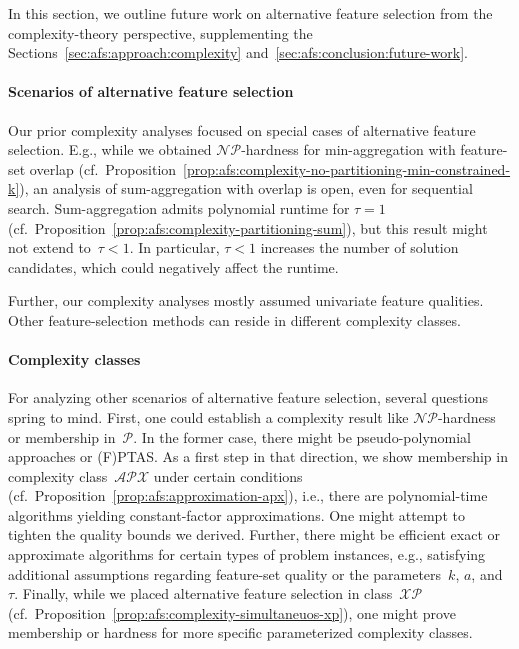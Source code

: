 \documentclass{article}
\theoremstyle{definition}
\begin{document}
In this section, we outline future work on alternative feature selection from the complexity-theory perspective, supplementing the Sections~\ref{sec:afs:approach:complexity} and~\ref{sec:afs:conclusion:future-work}.

\paragraph{Scenarios of alternative feature selection}

Our prior complexity analyses focused on special cases of alternative feature selection.
E.g., while we obtained $\mathcal{NP}$-hardness for min-aggregation with feature-set overlap (cf.~Proposition~\ref{prop:afs:complexity-no-partitioning-min-constrained-k}), an analysis of sum-aggregation with overlap is open, even for sequential search.
Sum-aggregation admits polynomial runtime for $\tau=1$ (cf.~Proposition~\ref{prop:afs:complexity-partitioning-sum}), but this result might not extend to~$\tau < 1$.
In particular, $\tau < 1$ increases the number of solution candidates, which could negatively affect the runtime.

Further, our complexity analyses mostly assumed univariate feature qualities.
Other feature-selection methods can reside in different complexity classes.

\paragraph{Complexity classes}

For analyzing other scenarios of alternative feature selection, several questions spring to mind.
First, one could establish a complexity result like $\mathcal{NP}$-hardness or membership in~$\mathcal{P}$.
In the former case, there might be pseudo-polynomial approaches or (F)PTAS.
As a first step in that direction, we show membership in complexity class~$\mathcal{APX}$ under certain conditions (cf.~Proposition~\ref{prop:afs:approximation-apx}), i.e., there are polynomial-time algorithms yielding constant-factor approximations.
One might attempt to tighten the quality bounds we derived.
Further, there might be efficient exact or approximate algorithms for certain types of problem instances, e.g., satisfying additional assumptions regarding feature-set quality or the parameters~$k$, $a$, and $\tau$.
Finally, while we placed alternative feature selection in class~$\mathcal{XP}$ (cf.~Proposition~\ref{prop:afs:complexity-simultaneuos-xp}), one might prove membership or hardness for more specific parameterized complexity classes.
\end{document}
